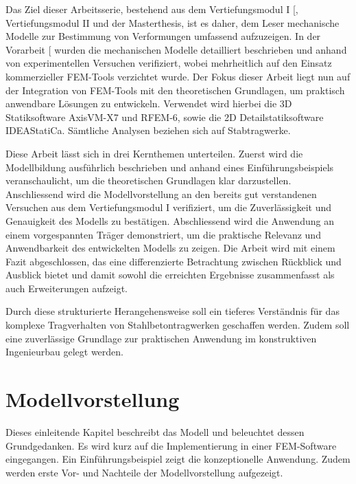 \documentclass[
  11pt,
  letterpaper,
]{scrreprt}
\begin{document}
Das Ziel dieser Arbeitsserie, bestehend aus dem Vertiefungsmodul I
{[}\citeproc{ref-gitz_ansatze_2024}{1}{]}, Vertiefungsmodul II und der
Masterthesis, ist es daher, dem Leser mechanische Modelle zur Bestimmung
von Verformungen umfassend aufzuzeigen. In der Vorarbeit
{[}\citeproc{ref-gitz_ansatze_2024}{1}{]} wurden die mechanischen
Modelle detailliert beschrieben und anhand von experimentellen Versuchen
verifiziert, wobei mehrheitlich auf den Einsatz kommerzieller FEM-Tools
verzichtet wurde. Der Fokus dieser Arbeit liegt nun auf der Integration
von FEM-Tools mit den theoretischen Grundlagen, um praktisch anwendbare
Lösungen zu entwickeln. Verwendet wird hierbei die 3D Statiksoftware
AxisVM-X7 und RFEM-6, sowie die 2D Detailstatiksoftware IDEAStatiCa.
Sämtliche Analysen beziehen sich auf Stabtragwerke.

Diese Arbeit lässt sich in drei Kernthemen unterteilen. Zuerst wird die
Modellbildung ausführlich beschrieben und anhand eines
Einführungsbeispiels veranschaulicht, um die theoretischen Grundlagen
klar darzustellen. Anschliessend wird die Modellvorstellung an den
bereits gut verstandenen Versuchen aus dem Vertiefungsmodul I
verifiziert, um die Zuverlässigkeit und Genauigkeit des Modells zu
bestätigen. Abschliessend wird die Anwendung an einem vorgespannten
Träger demonstriert, um die praktische Relevanz und Anwendbarkeit des
entwickelten Modells zu zeigen. Die Arbeit wird mit einem Fazit
abgeschlossen, das eine differenzierte Betrachtung zwischen Rückblick
und Ausblick bietet und damit sowohl die erreichten Ergebnisse
zusammenfasst als auch Erweiterungen aufzeigt.

Durch diese strukturierte Herangehensweise soll ein tieferes Verständnis
für das komplexe Tragverhalten von Stahlbetontragwerken geschaffen
werden. Zudem soll eine zuverlässige Grundlage zur praktischen Anwendung
im konstruktiven Ingenieurbau gelegt werden.


\chapter{Modellvorstellung}\label{modellvorstellung}

Dieses einleitende Kapitel beschreibt das Modell und beleuchtet dessen
Grundgedanken. Es wird kurz auf die Implementierung in einer
FEM-Software eingegangen. Ein Einführungsbeispiel zeigt die
konzeptionelle Anwendung. Zudem werden erste Vor- und Nachteile der
Modellvorstellung aufgezeigt.
\end{document}
